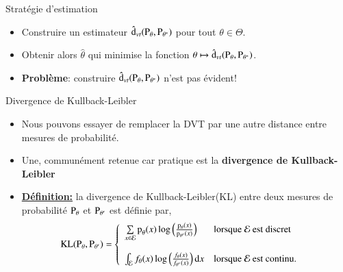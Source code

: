 \begin{frame}
    [allowframebreaks]{Stratégie d'estimation}
    \begin{itemize}
        \item Construire un estimateur $\hat{\operatorname{d}}_{vt}(\operatorname{P}_\theta, \operatorname{P}_{\theta^*})$ pour tout $\theta\in \Theta$.
        \item Obtenir alors $\hat{\theta}$ qui minimise la fonction $\theta\mapsto \hat{\operatorname{d}}_{vt}(\operatorname{P}_\theta, \operatorname{P}_{\theta^*})$.
        \item \textbf{Problème}: construire $\hat{\operatorname{d}}_{vt}(\operatorname{P}_\theta, \operatorname{P}_{\theta^*})$ n'est pas évident!
    \end{itemize}
\end{frame}
\begin{frame}
    [allowframebreaks]{Divergence de Kullback-Leibler}
    \begin{itemize}
        \item Nous pouvons  essayer de remplacer la DVT par une autre distance entre mesures de probabilité.
        \item Une, communément retenue car pratique est la \textbf{divergence de Kullback-Leibler}
        \item \textbf{\underline{Définition:}} la divergence de Kullback-Leibler(KL) entre deux mesures 
        de probabilité $\operatorname{P}_\theta$ et $\operatorname{P}_{\theta^\prime}$ 
        est définie par,
        \begin{align*}
            \operatorname{KL}(\operatorname{P}_\theta, \operatorname{P}_{\theta^\prime})&=\left\{
                \begin{array}{ll}
                    \underset{x\in \mathcal{E}}{\sum} \operatorname{p}_\theta(x)\log\left(\frac{\operatorname{p}_\theta(x)}{\operatorname{p}_{\theta^\prime}(x)}\right)
                    & \textrm{lorsque} \ \mathcal{E} \ \textrm{est discret}\\
                    &\\
                    \int_{\mathcal{E}} f_\theta(x)\log\left(\frac{f_\theta(x)}{f_{\theta^\prime}(x)}\right)\mathrm{d}x
                    & \textrm{lorsque} \ \mathcal{E} \ \textrm{est continu}.
                \end{array}
            \right.
        \end{align*}
    \end{itemize}
\end{frame}
